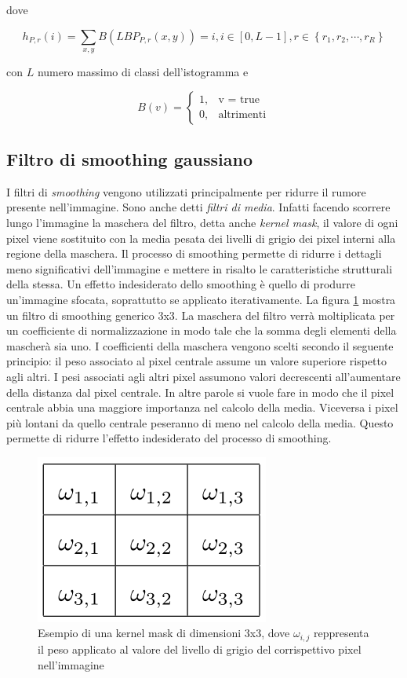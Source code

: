 \noindent dove

\begin{equation}
h_{P,r}(i) = \sum_{x, y} B(LBP_{P,r}(x, y)) = i, i \in  [0, L-1 ], r \in \left\lbrace  r_1, r_2, \cdots, r_R \right\rbrace
\end{equation}

\noindent con $L$ numero massimo di classi dell'istogramma e

\begin{equation}
B(v) = 	\begin{cases} 1, & \mbox{v = true} \\ 0, & \mbox{altrimenti} \end{cases}
\end{equation}

\subsection{Filtro di smoothing gaussiano}
I filtri di \emph{smoothing} vengono utilizzati principalmente per ridurre il rumore presente nell'immagine. Sono anche detti \emph{filtri di media}. Infatti facendo scorrere lungo l'immagine la maschera del filtro, detta anche \emph{kernel mask}, il valore di ogni pixel viene sostituito con la media pesata dei livelli di grigio dei pixel interni alla regione della maschera. Il processo di smoothing permette di ridurre i dettagli meno significativi dell'immagine e mettere in risalto le caratteristiche strutturali della stessa.
Un effetto indesiderato dello smoothing è quello di produrre un'immagine sfocata, soprattutto se applicato iterativamente.
La figura \ref{fig:kernelMask} mostra un filtro di smoothing generico 3x3. La maschera del filtro verrà moltiplicata per un coefficiente di normalizzazione in modo tale che la somma degli elementi della mascherà sia uno. I coefficienti della maschera vengono scelti secondo il seguente principio: il peso associato al pixel centrale assume un valore superiore rispetto agli altri. I pesi associati agli altri pixel assumono valori decrescenti all'aumentare della distanza dal pixel centrale. In altre parole si vuole fare in modo che il pixel centrale abbia una maggiore importanza nel calcolo della media. Viceversa i pixel più lontani da quello centrale peseranno di meno nel calcolo della media. Questo permette di ridurre l'effetto indesiderato del processo di smoothing.

\begin{figure}[ht]
\begin{center}
\includegraphics[width=.3\textwidth]{img/kernel_mask}
\caption{ Esempio di una kernel mask di dimensioni 3x3, dove $\omega_{i,j}$ reppresenta il peso applicato al valore del livello di grigio del corrispettivo pixel nell'immagine}
\label{fig:kernelMask}
\end{center}
\end{figure}

